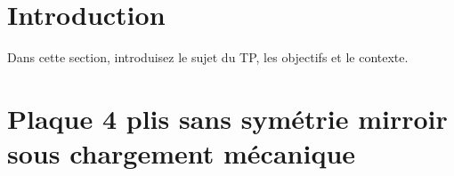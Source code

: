 \documentclass[a4paper,12pt]{article}
\begin{document}
\pagestyle{fancy}
\fancyhf{} %
\fancyfoot[R]{\thepage} %
\renewcommand{\headrulewidth}{0.4pt} %

\tableofcontents
\newpage

\section{Introduction}
Dans cette section, introduisez le sujet du TP, les objectifs et le contexte.

\section{Plaque 4 plis sans symétrie mirroir sous chargement mécanique}
\end{document}
